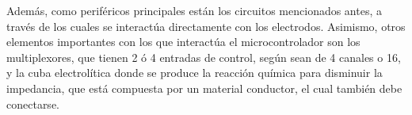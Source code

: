 Además, como periféricos principales están los circuitos mencionados antes, a través de los cuales se interactúa directamente con los electrodos. Asimismo, otros elementos importantes con los que interactúa el microcontrolador son los multiplexores, que tienen 2 ó 4 entradas de control, según sean de 4 canales o 16, y la cuba electrolítica donde se produce la reacción química para disminuir la impedancia, que está compuesta por un material conductor, el cual también debe conectarse.





